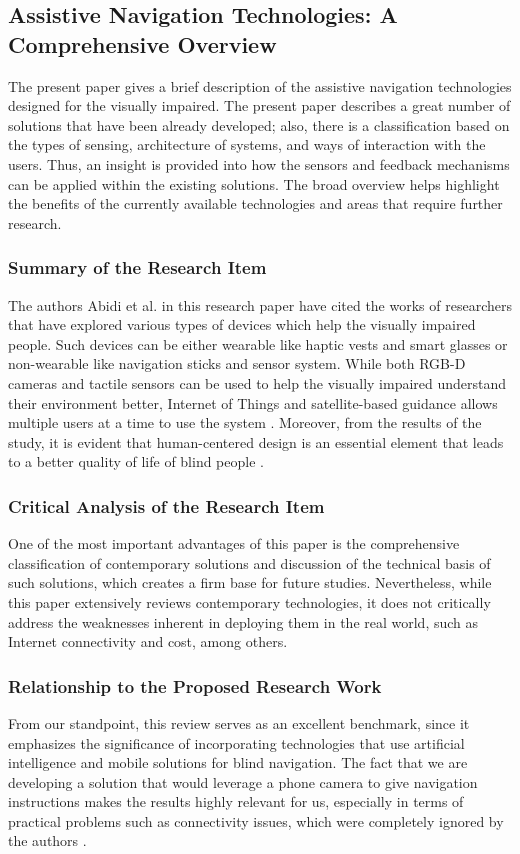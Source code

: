 \documentclass{FastFyp}
\begin{document}
\subsection{Assistive Navigation Technologies: A Comprehensive Overview}
The present paper gives a brief description of the assistive navigation technologies designed for the visually impaired. The present paper describes a great number of solutions that have been already developed; also, there is a classification based on the types of sensing, architecture of systems, and ways of interaction with the users. Thus, an insight is provided into how the sensors and feedback mechanisms can be applied within the existing solutions. The broad overview helps highlight the benefits of the currently available technologies and areas that require further research.

\subsubsection{Summary of the Research Item}  
The authors Abidi et al. \cite{ref:abidi2024comprehensive} in this research paper have cited the works of researchers that have explored various types of devices which help the visually impaired people. Such devices can be either wearable like haptic vests and smart glasses or non-wearable like navigation sticks and sensor system. While both RGB-D cameras and tactile sensors can be used to help the visually impaired understand their environment better, Internet of Things and satellite-based guidance allows multiple users at a time to use the system \cite{ref:abidi2024comprehensive}. Moreover, from the results of the study, it is evident that human-centered design is an essential element that leads to a better quality of life of blind people \cite{ref:abidi2024comprehensive}.

\subsubsection{Critical Analysis of the Research Item}  
One of the most important advantages of this paper is the comprehensive classification of contemporary solutions and discussion of the technical basis of such solutions, which creates a firm base for future studies. Nevertheless, while this paper extensively reviews contemporary technologies, it does not critically address the weaknesses inherent in deploying them in the real world, such as Internet connectivity and cost, among others.

\subsubsection{Relationship to the Proposed Research Work}  
From our standpoint, this review serves as an excellent benchmark, since it emphasizes the significance of incorporating technologies that use artificial intelligence and mobile solutions for blind navigation. The fact that we are developing a solution that would leverage a phone camera to give navigation instructions makes the results highly relevant for us, especially in terms of practical problems such as connectivity issues, which were completely ignored by the authors \cite{ref:abidi2024comprehensive}.
\end{document}
